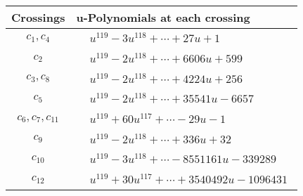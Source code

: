 \documentclass[1p]{elsarticle_modified}
\theoremstyle{definition}
\begin{document}
\begin{tabular}{m{50pt}|m{274pt}}
Crossings & \hspace{64pt}u-Polynomials at each crossing \\
\hline $$\begin{aligned}c_{1},c_{4}\end{aligned}$$&$\begin{aligned}
&u^{119}-3 u^{118}+\cdots+27 u+1
\end{aligned}$\\
\hline $$\begin{aligned}c_{2}\end{aligned}$$&$\begin{aligned}
&u^{119}-2 u^{118}+\cdots+6606 u+599
\end{aligned}$\\
\hline $$\begin{aligned}c_{3},c_{8}\end{aligned}$$&$\begin{aligned}
&u^{119}-2 u^{118}+\cdots+4224 u+256
\end{aligned}$\\
\hline $$\begin{aligned}c_{5}\end{aligned}$$&$\begin{aligned}
&u^{119}-2 u^{118}+\cdots+35541 u-6657
\end{aligned}$\\
\hline $$\begin{aligned}c_{6},c_{7},c_{11}\end{aligned}$$&$\begin{aligned}
&u^{119}+60 u^{117}+\cdots-29 u-1
\end{aligned}$\\
\hline $$\begin{aligned}c_{9}\end{aligned}$$&$\begin{aligned}
&u^{119}-2 u^{118}+\cdots+336 u+32
\end{aligned}$\\
\hline $$\begin{aligned}c_{10}\end{aligned}$$&$\begin{aligned}
&u^{119}-3 u^{118}+\cdots-8551161 u-339289
\end{aligned}$\\
\hline $$\begin{aligned}c_{12}\end{aligned}$$&$\begin{aligned}
&u^{119}+30 u^{117}+\cdots+3540492 u-1096431
\end{aligned}$\\
\hline
\end{tabular}\\~\\
\end{document}
